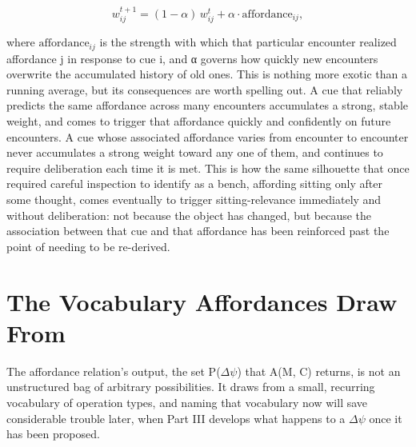 \[ w^{t+1}_{ij} = (1-\alpha)\, w^t_{ij} + \alpha \cdot \mathrm{affordance}_{ij}, \]

where \(\mathrm{affordance}_{ij}\) is the strength with which that particular encounter realized affordance j in response to cue i, and α governs how quickly new encounters overwrite the accumulated history of old ones. This is nothing more exotic than a running average, but its consequences are worth spelling out. A cue that reliably predicts the same affordance across many encounters accumulates a strong, stable weight, and comes to trigger that affordance quickly and confidently on future encounters. A cue whose associated affordance varies from encounter to encounter never accumulates a strong weight toward any one of them, and continues to require deliberation each time it is met. This is how the same silhouette that once required careful inspection to identify as a bench, affording sitting only after some thought, comes eventually to trigger sitting-relevance immediately and without deliberation: not because the object has changed, but because the association between that cue and that affordance has been reinforced past the point of needing to be re-derived.

\section{The Vocabulary Affordances Draw From}

The affordance relation's output, the set P(\(\Delta\psi\)) that A(M, C) returns, is not an unstructured bag of arbitrary possibilities. It draws from a small, recurring vocabulary of operation types, and naming that vocabulary now will save considerable trouble later, when Part III develops what happens to a \(\Delta\psi\) once it has been proposed.

